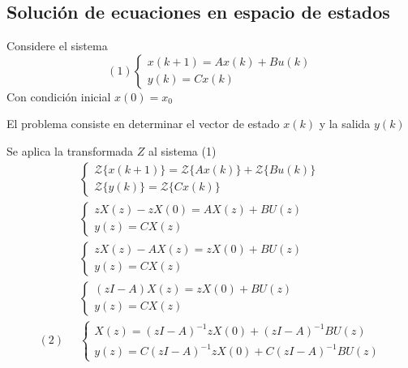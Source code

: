 \subsection{Solución de ecuaciones en espacio de estados}

Considere el sistema
\[(1)
    \left\{
        \begin{array}{lll}
            x(k+1)= Ax(k) + Bu(k) \\
            y(k) = Cx(k)
        \end{array}
    \right.
\]
Con condición inicial \( x(0) = x_{0} \)

El problema consiste en determinar el vector de estado \( x(k) \) y la salida \( y(k) \)

Se aplica la transformada \( Z \) al sistema (1)
\[
    \begin{split}
        &\left\{
        \begin{array}{lll}
            \mathcal{Z} \{ x(k+1) \}= \mathcal{Z} \{ Ax(k) \} + \mathcal{Z} \{ Bu(k) \} \\
            \mathcal{Z} \{ y(k) \} = \mathcal{Z} \{ Cx(k) \}
        \end{array}
        \right. \\
        &\left\{
            \begin{array}{lll}
                zX(z) -zX(0) = AX(z) + BU(z) \\
                y(z) = CX(z)
            \end{array}
        \right. \\
        &\left\{
            \begin{array}{lll}
                zX(z) - AX(z) = zX(0) + BU(z) \\
                y(z) = CX(z)
            \end{array}
        \right. \\
        &\left\{
            \begin{array}{lll}
                (zI-A)X(z) = zX(0) + BU(z) \\
                y(z) = CX(z)
            \end{array}
        \right. \\
        (2) \;\; &\left\{
            \begin{array}{lll}
                X(z) = (zI-A)^{-1}zX(0) + (zI-A)^{-1}BU(z) \\
                y(z) = C(zI-A)^{-1}zX(0) + C(zI-A)^{-1}BU(z)
            \end{array}
        \right.
        \end{split}
\]

